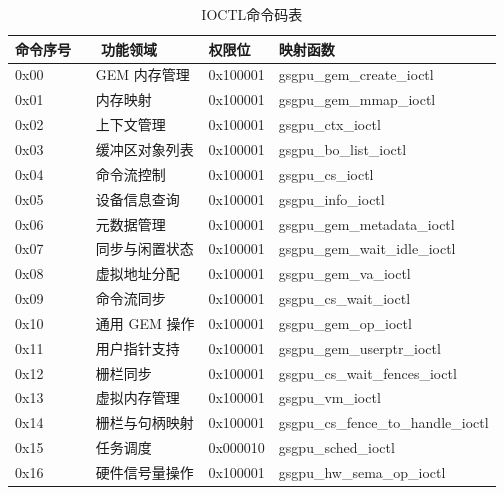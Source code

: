 \begin{table}[h]  
  \centering
  \caption{IOCTL命令码表}
  \label{tab:IOCTL命令码表}
  \begin{tabular}{llll}
    \toprule
    命令序号  ​	​ &​ 功能领域​	& 权限位 & 映射函数 \\
    \midrule
    0x00		& ​GEM 内存管理​ & 0x100001 & gsgpu\_gem\_create\_ioctl \\
    0x01		& ​内存映射​ & 0x100001 & gsgpu\_gem\_mmap\_ioctl \\
    0x02		& ​上下文管理​	& 0x100001 & gsgpu\_ctx\_ioctl\\
    0x03		& ​缓冲区对象列表​	& 0x100001 & gsgpu\_bo\_list\_ioctl\\
    0x04		& ​命令流控制​	& 0x100001 & gsgpu\_cs\_ioctl\\
    0x05		& ​设备信息查询​	& 0x100001 & gsgpu\_info\_ioctl\\
    0x06		& ​元数据管理​	& 0x100001 & gsgpu\_gem\_metadata\_ioctl\\
    0x07		& ​同步与闲置状态​	& 0x100001 & gsgpu\_gem\_wait\_idle\_ioctl\\
    0x08		& ​虚拟地址分配​	& 0x100001 & gsgpu\_gem\_va\_ioctl\\
    0x09		& ​命令流同步​	& 0x100001 & gsgpu\_cs\_wait\_ioctl\\
    0x10		& ​通用 GEM 操作​	& 0x100001 & gsgpu\_gem\_op\_ioctl\\
    0x11		& ​用户指针支持​	& 0x100001 & gsgpu\_gem\_userptr\_ioctl\\
    0x12		& ​栅栏同步​	& 0x100001 & gsgpu\_cs\_wait\_fences\_ioctl\\
    0x13		& ​虚拟内存管理​	& 0x100001 & gsgpu\_vm\_ioctl\\
    0x14		& ​栅栏与句柄映射​	& 0x100001 & gsgpu\_cs\_fence\_to\_handle\_ioctl\\
    0x15		& ​任务调度 & 0x000010 & gsgpu\_sched\_ioctl\\
    0x16		& ​硬件信号量操作​	& 0x100001 & gsgpu\_hw\_sema\_op\_ioctl\\
    \bottomrule
    \end{tabular}
  
  \note{}
\end{table}

